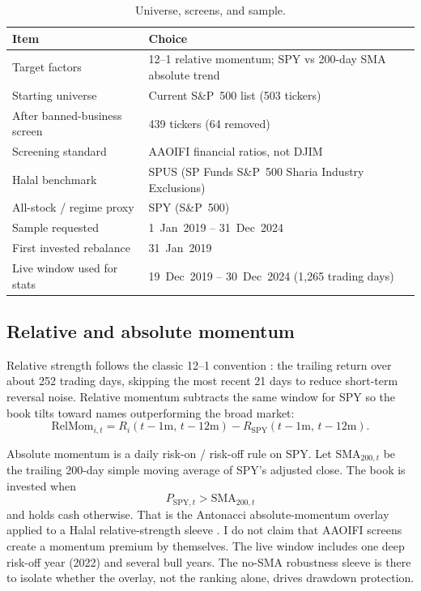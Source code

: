 \documentclass[11pt,letterpaper]{article}
\begin{document}
\begin{table}[htbp]
\centering
\caption{Universe, screens, and sample.}
\label{tab:universe}
\begin{tabular}{ll}
\toprule
Item & Choice \\
\midrule
Target factors & 12--1 relative momentum; SPY vs 200-day SMA absolute trend \\
Starting universe & Current S\&P~500 list (503 tickers) \\
After banned-business screen & 439 tickers (64 removed) \\
Screening standard & AAOIFI financial ratios, not DJIM \\
Halal benchmark & SPUS (SP Funds S\&P~500 Sharia Industry Exclusions) \\
All-stock / regime proxy & SPY (S\&P~500) \\
Sample requested & 1~Jan~2019 -- 31~Dec~2024 \\
First invested rebalance & 31~Jan~2019 \\
Live window used for stats & 19~Dec~2019 -- 30~Dec~2024 (1{,}265 trading days) \\
\bottomrule
\end{tabular}
\end{table}

\subsection{Relative and absolute momentum}

Relative strength follows the classic 12--1 convention \citep{jegadeesh1993}: the trailing return over about 252 trading days, skipping the most recent 21 days to reduce short-term reversal noise. Relative momentum subtracts the same window for SPY so the book tilts toward names outperforming the broad market:
\[
\mathrm{RelMom}_{i,t}
= R_{i}(t-1\mathrm{m},\, t-12\mathrm{m})
- R_{\mathrm{SPY}}(t-1\mathrm{m},\, t-12\mathrm{m}).
\]

Absolute momentum is a daily risk-on / risk-off rule on SPY. Let $\mathrm{SMA}_{200,t}$ be the trailing 200-day simple moving average of SPY's adjusted close. The book is invested when
\[
P_{\mathrm{SPY},t} > \mathrm{SMA}_{200,t}
\]
and holds cash otherwise. That is the Antonacci absolute-momentum overlay applied to a Halal relative-strength sleeve \citep{antonacci2014,moskowitz2012}. I do not claim that AAOIFI screens create a momentum premium by themselves. The live window includes one deep risk-off year (2022) and several bull years. The no-SMA robustness sleeve is there to isolate whether the overlay, not the ranking alone, drives drawdown protection.
\end{document}
